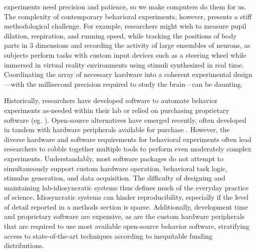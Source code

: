 
 experiments need precision and patience, so we make computers do them for us. The complexity of contemporary behavioral experiments, however, presents a stiff methodological challenge. For example, researchers might wish to measure pupil dilation\citep{reimerPupilFluctuationsTrack2016, reimerPupilFluctuationsTrack2016}, respiration\citep{parabuckiOdorConcentrationChange2019}, and running speed\citep{niellModulationVisualResponses2010}, while tracking the positions of body parts in 3 dimensions\citep{nathUsingDeepLabCut3D2019} and recording the activity of large ensembles of neurons\citep{junFullyIntegratedSilicon2017}, as subjects perform tasks with custom input devices such as a steering wheel\citep{burgessHighYieldMethodsAccurate2017} while immersed in virtual reality environments using stimuli synthesized in real time\citep{thurleyVirtualRealitySystems2017,chambersOnlineStimulusOptimization2014}. Coordinating the array of necessary hardware into a coherent experimental design---with the millisecond precision required to study the brain---can be daunting.

Historically, researchers have developed software to automate behavior experiments as-needed within their lab or relied on purchasing proprietary software (eg. \citep{elliottNationalInstrumentsLabVIEW2007}). Open-source alternatives have emerged recently, often developed in tandem with hardware peripherals available for purchase \citep{ephysPyControl2019,sandersSanworksBPod}. However, the diverse hardware and software requirements for behavioral experiments often lead researchers to cobble together multiple tools to perform even moderately complex experiments. Understandably, most software packages do not attempt to simultaneously support custom hardware operation, behavioral task logic, stimulus generation, and data acquisition. The difficulty of designing and maintaining lab-idiosyncratic systems thus defines much of the everyday practice of science. Idiosyncratic systems can hinder reproducibility, especially if the level of detail reported in a methods section is sparse\citep{wallReliabilityStartsExperimental2019}. Additionally, development time and proprietary software are expensive, as are the custom hardware peripherals that are required to use most available open-source behavior software, stratifying access to state-of-the-art techniques according to inequitable funding distributions.


